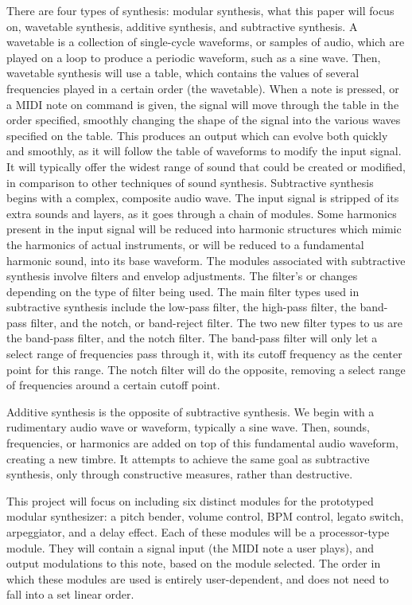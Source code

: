 There are four types of synthesis: modular synthesis, what this paper will focus on, wavetable synthesis, additive synthesis, and subtractive synthesis. A wavetable is a collection of single-cycle waveforms, or samples of audio, which are played on a loop to produce a periodic waveform, such as a sine wave. Then, wavetable synthesis will use a table, which contains the values of several frequencies played in a certain order (the wavetable). When a note is pressed, or a MIDI note on command is given, the signal will move through the table in the order specified, smoothly changing the shape of the signal into the various waves specified on the table. This produces an output which can evolve both quickly and smoothly, as it will follow the table of waveforms to modify the input signal. It will typically offer the widest range of sound that could be created or modified, in comparison to other techniques of sound synthesis\cite{Gabrielli_2020}.
Subtractive synthesis begins with a complex, composite audio wave. The input signal is stripped of its extra sounds and layers, as it goes through a chain of modules. Some harmonics present in the input signal will be reduced into harmonic structures which mimic the harmonics of actual instruments, or will be reduced to a fundamental harmonic sound, into its base waveform\cite{Gabrielli_2020}. The modules associated with subtractive synthesis involve filters and envelop adjustments. The filter's  or  changes depending on the type of filter being used. The main filter types used in subtractive synthesis include the low-pass filter, the high-pass filter, the band-pass filter, and the notch, or band-reject filter. The two new filter types to us are the band-pass filter, and the notch filter. The band-pass filter will only let a select range of frequencies pass through it, with its cutoff frequency as the center point for this range. The notch filter will do the opposite, removing a select range of frequencies around a certain cutoff point\cite{Gabrielli_2020}.

Additive synthesis is the opposite of subtractive synthesis. We begin with a rudimentary audio wave or waveform, typically a sine wave. Then, sounds, frequencies, or harmonics are added on top of this fundamental audio waveform, creating a new timbre\cite{Winer_2018}. It attempts to achieve the same goal as subtractive synthesis, only through constructive measures, rather than destructive. 

This project will focus on including six distinct modules for the prototyped modular synthesizer: a pitch bender, volume control, BPM control, legato switch, arpeggiator, and a delay effect. Each of these modules will be a processor-type module. They will contain a signal input (the MIDI note a user plays), and output modulations to this note, based on the module selected. The order in which these modules are used is entirely user-dependent, and does not need to fall into a set linear order. 